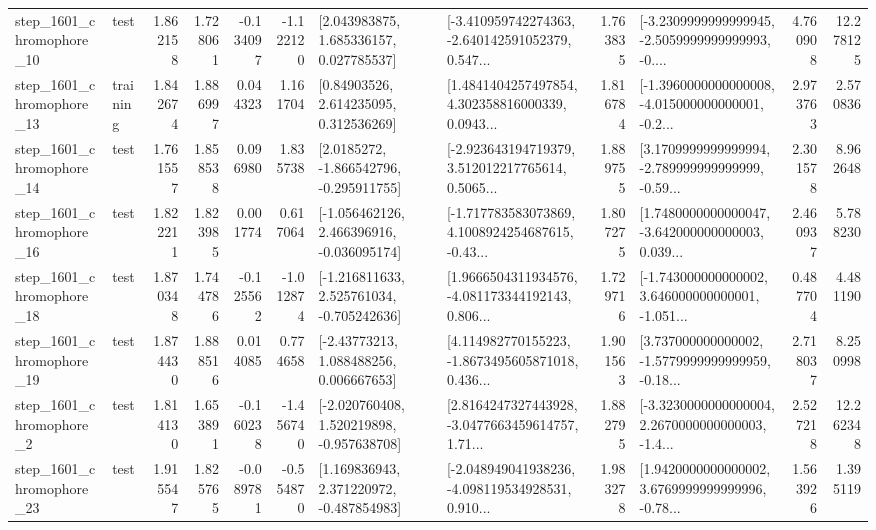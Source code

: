 \begin{tabular}{llrrrrllrlrr}
 step\_1601\_chromophore\_10 &      test &      1.862158 &    1.728061 &     -0.134097 & -1.122120 &     [2.043983875, 1.685336157, 0.027785537] &  [-3.410959742274363, -2.640142591052379, 0.547... &       1.763835 &  [-3.2309999999999945, -2.5059999999999993, -0.... &            4.760908 &         12.278125 \\
 step\_1601\_chromophore\_13 &  training &      1.842674 &    1.886997 &      0.044323 &  1.161704 &      [0.84903526, 2.614235095, 0.312536269] &  [1.4841404257497854, 4.302358816000339, 0.0943... &       1.816784 &  [-1.3960000000000008, -4.015000000000001, -0.2... &            2.973763 &          2.570836 \\
 step\_1601\_chromophore\_14 &      test &      1.761557 &    1.858538 &      0.096980 &  1.835738 &     [2.0185272, -1.866542796, -0.295911755] &  [-2.923643194719379, 3.512012217765614, 0.5065... &       1.889755 &  [3.1709999999999994, -2.789999999999999, -0.59... &            2.301578 &          8.962648 \\
 step\_1601\_chromophore\_16 &      test &      1.822211 &    1.823985 &      0.001774 &  0.617064 &   [-1.056462126, 2.466396916, -0.036095174] &  [-1.717783583073869, 4.1008924254687615, -0.43... &       1.807275 &  [1.7480000000000047, -3.642000000000003, 0.039... &            2.460937 &          5.788230 \\
 step\_1601\_chromophore\_18 &      test &      1.870348 &    1.744786 &     -0.125562 & -1.012874 &   [-1.216811633, 2.525761034, -0.705242636] &  [1.9666504311934576, -4.081173344192143, 0.806... &       1.729716 &  [-1.743000000000002, 3.646000000000001, -1.051... &            0.487704 &          4.481190 \\
 step\_1601\_chromophore\_19 &      test &      1.874430 &    1.888516 &      0.014085 &  0.774658 &     [-2.43773213, 1.088488256, 0.006667653] &  [4.114982770155223, -1.8673495605871018, 0.436... &       1.901563 &  [3.737000000000002, -1.5779999999999959, -0.18... &            2.718037 &          8.250998 \\
  step\_1601\_chromophore\_2 &      test &      1.814130 &    1.653891 &     -0.160238 & -1.456740 &   [-2.020760408, 1.520219898, -0.957638708] &  [2.8164247327443928, -3.0477663459614757, 1.71... &       1.882795 &  [-3.3230000000000004, 2.2670000000000003, -1.4... &            2.527218 &         12.262348 \\
 step\_1601\_chromophore\_23 &      test &      1.915547 &    1.825765 &     -0.089781 & -0.554870 &    [1.169836943, 2.371220972, -0.487854983] &  [-2.048949041938236, -4.098119534928531, 0.910... &       1.983278 &  [1.9420000000000002, 3.6769999999999996, -0.78... &            1.563926 &          1.395119 \\

\end{tabular}
